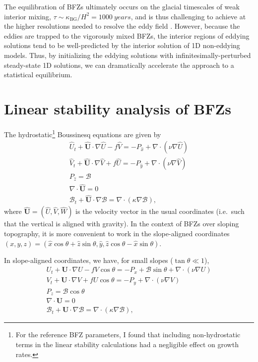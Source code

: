 \documentclass{article}
\begin{document}
The equilibration of BFZs ultimately occurs on the glacial timescales of weak interior mixing, $\tau \sim \kappa_{\text{BG}}/H^{2} = \SI{1000}{years}$, and is thus challenging to achieve at the higher resolutions needed to resolve the eddy field \citep{drake_dynamics_2022}. However, because the eddies are trapped to the vigorously mixed BFZs, the interior regions of eddying solutions tend to be well-predicted by the interior solution of 1D non-eddying models. Thus, by initializing the eddying solutions with infinitesimally-perturbed steady-state 1D solutions, we can dramatically accelerate the approach to a statistical equilibrium.

\section{Linear stability analysis of BFZs}

The hydrostatic\footnote{For the reference BFZ parameters, I found that including non-hydrostatic terms in the linear stability calculations had a negligible effect on growth rates.} Boussinesq equations are given by
\begin{gather}
\hat{U}_{t} + \hat{\mathbf{U}} \cdot \nabla \hat{U} -f\hat{V} = -P_{\hat{x}} +  \nabla \cdot (\nu \nabla \hat{U}) \\
\hat{V}_{t} + \hat{\mathbf{U}} \cdot \nabla \hat{V} +f\hat{U} = -P_{\hat{y}} +  \nabla \cdot (\nu \nabla \hat{V}) \\
P_{\hat{z}} = \mathcal{B} \\
\nabla \cdot \hat{\mathbf{U}} = 0 \\
\mathcal{B}_{t} + \hat{\mathbf{U}} \cdot \nabla \mathcal{B} = \nabla \cdot \left( \kappa \nabla \mathcal{B} \right),
\end{gather}
where $\hat{\mathbf{U}}=(\hat{U},\hat{V},\hat{W})$ is the velocity vector in the usual coordinates (i.e.~such that the vertical is aligned with gravity). In the context of BFZs over sloping topography, it is more convenient to work in the slope-aligned coordinates $(x,y,z)=(\hat{x}\cos{\theta} + \hat{z}\sin{\theta}, \hat{y}, \hat{z}\cos{\theta} - \hat{x}\sin{\theta})$.

In slope-aligned coordinates, we have, for small slopes ($\tan{\theta} \ll 1$),
\begin{gather}
U_{t} + \mathbf{U} \cdot \nabla U -fV\cos{\theta} = -P_{x} + \mathcal{B}\sin{\theta} +  \nabla \cdot (\nu \nabla U) \label{eq:slope-aligned-x-momentum} \\
V_{t} + \mathbf{U} \cdot \nabla V +fU\cos{\theta} = -P_{y} + \nabla \cdot (\nu \nabla V) \\
P_{z} = \mathcal{B}\cos{\theta} \\
\nabla \cdot \mathbf{U} = 0 \\
\mathcal{B}_{t} + \mathbf{U} \cdot \nabla \mathcal{B} = \nabla \cdot \left( \kappa \nabla \mathcal{B} \right), \label{eq:slope-aligned-buoyancy}
\end{gather}
\end{document}
